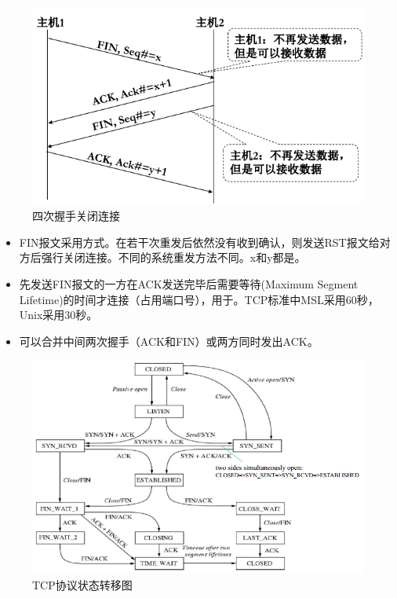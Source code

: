 \myhline
\begin{figure}[H]
    \centering
    \includegraphics[width=0.6\linewidth]{fig/tcp_close.png}
    \caption*{四次握手关闭连接}
\end{figure}
\begin{itemize}
    \item FIN报文采用方式。在若干次重发后依然没有收到确认，则发送RST报文给对方后强行关闭连接。不同的系统重发方法不同。x和y都是。
    \item 先发送FIN报文的一方在ACK发送完毕后需要等待(Maximum Segment Lifetime)的时间才连接（占用端口号），用于。TCP标准中MSL采用60秒，Unix采用30秒。
    \item 可以合并中间两次握手（ACK和FIN）或两方同时发出ACK。
\end{itemize}

\myhline
\begin{figure}[H]
    \centering
    \includegraphics[width=0.8\linewidth]{fig/TCP-transition.PNG}
    \caption*{TCP协议状态转移图}
\end{figure}

